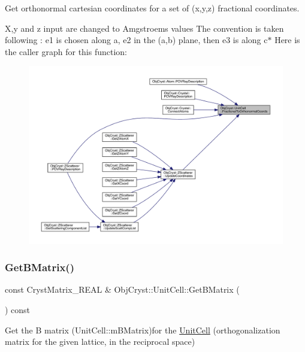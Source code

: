 Get orthonormal cartesian coordinates for a set of (x,y,z) fractional coordinates. 

X,y and z input are changed to Amgstroems values The convention is taken following \+: e1 is chosen along a, e2 in the (a,b) plane, then e3 is along c$\ast$ Here is the caller graph for this function\+:
\nopagebreak
\begin{figure}[H]
\begin{center}
\leavevmode
\includegraphics[width=350pt]{class_obj_cryst_1_1_unit_cell_ae450547d6d700cd21accfb3a05d8192f_icgraph}
\end{center}
\end{figure}
\mbox{\label{class_obj_cryst_1_1_unit_cell_ac0cdfda8a5ebab4ee60f3e55dc37c9a3}} 
\subsubsection{\texorpdfstring{GetBMatrix()}{GetBMatrix()}}
{\footnotesize\ttfamily const Cryst\+Matrix\+\_\+\+R\+E\+AL \& Obj\+Cryst\+::\+Unit\+Cell\+::\+Get\+B\+Matrix (\begin{DoxyParamCaption}{ }\end{DoxyParamCaption}) const}



Get the \textquotesingle{}B\textquotesingle{} matrix (Unit\+Cell\+::m\+B\+Matrix)for the \mbox{\hyperlink{class_obj_cryst_1_1_unit_cell}{Unit\+Cell}} (orthogonalization matrix for the given lattice, in the reciprocal space) 

